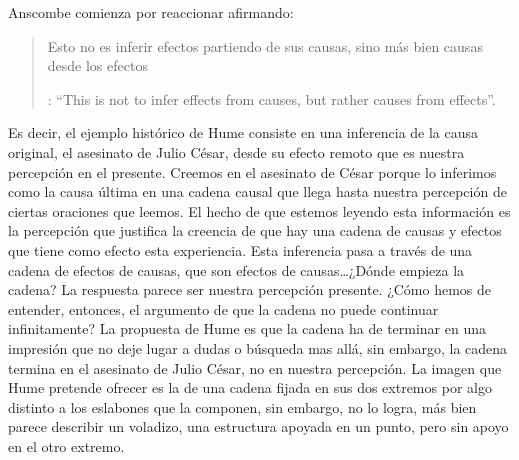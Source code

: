 Anscombe comienza por reaccionar afirmando: \blockquote[{\Cite[86]{anscombe1981parmenides:humeandjulius}}: \enquote{This is not to infer effects from causes, but rather causes from effects}.]{Esto no es inferir efectos partiendo de sus causas, sino más bien causas desde los efectos}. Es decir, el ejemplo histórico de Hume consiste en una inferencia de la causa original, el asesinato de Julio César, desde su efecto remoto que es nuestra percepción en el presente. Creemos en el asesinato de César porque lo inferimos como la causa última en una cadena causal que llega hasta nuestra percepción de ciertas oraciones que leemos. El hecho de que estemos leyendo esta información es la percepción que justifica la creencia de que hay una cadena de causas y efectos que tiene como efecto esta experiencia. Esta inferencia pasa a través de una cadena de efectos de causas, que son efectos de causas\ldots ¿Dónde empieza la cadena? La respuesta parece ser nuestra percepción presente. ¿Cómo hemos de entender, entonces, el argumento de que la cadena no puede continuar infinitamente? La propuesta de Hume es que la cadena ha de terminar en una impresión que no deje lugar a dudas o búsqueda mas allá, sin embargo, la cadena termina en el asesinato de Julio César, no en nuestra percepción. La imagen que Hume pretende ofrecer es la de una cadena fijada en sus dos extremos por algo distinto a los eslabones que la componen, sin embargo, no lo logra, más bien parece describir un voladizo, una estructura apoyada en un punto, pero sin apoyo en el otro extremo.

